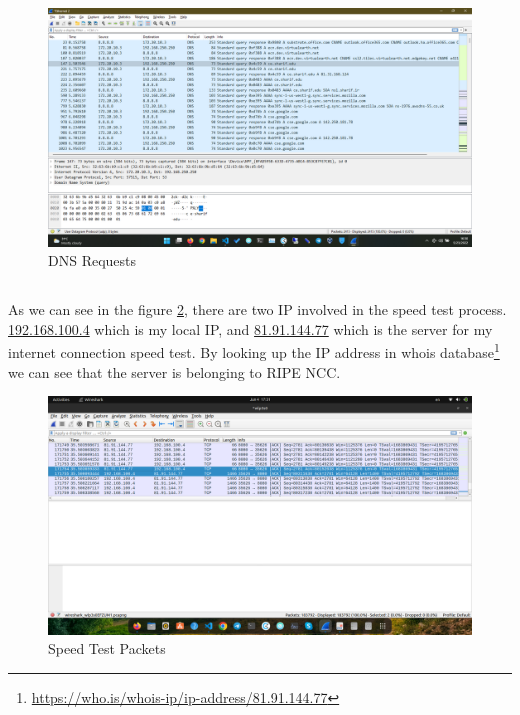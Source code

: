 \documentclass[en]{university}
\begin{document}
\begin{figure}
    \centering
    \includegraphics[width=\textwidth]{./resources/WSDNS.png}
    \caption{DNS Requests}
    \label{fig:WSDNS}
\end{figure}

\subsection{}
\subsubsection{}
As we can see in the figure \ref{fig:WSST}, there are two IP involved in the speed test process. \url{192.168.100.4} which is my local IP, and \url{81.91.144.77} which is the server for my internet connection speed test. By looking up the IP address in whois database\footnote{\url{https://who.is/whois-ip/ip-address/81.91.144.77}} we can see that the server is belonging to RIPE NCC.

\begin{figure}
    \centering
    \includegraphics[width=\textwidth]{./resources/WSST.png}
    \caption{Speed Test Packets}
    \label{fig:WSST}
\end{figure}
\end{document}
